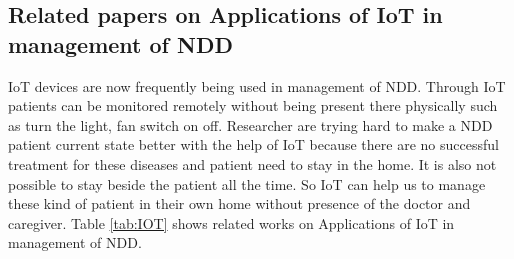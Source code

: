 \subsection{Related papers on Applications of IoT in management of NDD}

 IoT devices are now frequently being used in management of NDD. Through IoT patients can be monitored remotely without being present there physically such as turn the light, fan switch on off. Researcher are trying hard to make a NDD patient current state better with the help of IoT because there are no successful treatment for these diseases and patient need to stay in the home. It is also not possible to stay beside the patient all the time. So IoT can help us to manage these kind of patient in their own home without presence of the doctor and caregiver.
\vspace{0.5cm}
Table \ref{tab:IOT} shows related works on Applications of IoT in management of NDD.
